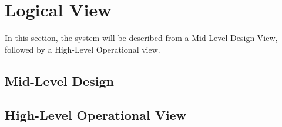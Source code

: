 \section{Logical View}

In this section, the system will be described from a Mid-Level Design View, followed by a High-Level Operational view.


\subsection{Mid-Level Design}


\subsection{High-Level Operational View}

